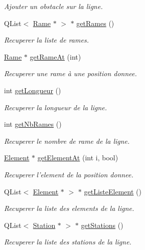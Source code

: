 \begin{DoxyCompactItemize}
\begin{DoxyCompactList}\small\item\em Ajouter un obstacle sur la ligne. \item\end{DoxyCompactList}\item 
QList$<$ \hyperlink{classRame}{Rame} $\ast$ $>$ $\ast$ \hyperlink{classLigne_aed26ffc704040dea3ba2b1a8b184a550}{getRames} ()
\begin{DoxyCompactList}\small\item\em Recuperer la liste de rames. \item\end{DoxyCompactList}\item 
\hyperlink{classRame}{Rame} $\ast$ \hyperlink{classLigne_a6c0c5346eff4bc5713241fd4f07fb9ef}{getRameAt} (int)
\begin{DoxyCompactList}\small\item\em Recuperer une rame à une position donnee. \item\end{DoxyCompactList}\item 
int \hyperlink{classLigne_a092ab7c50400c0580c23c9dcf3ba795b}{getLongueur} ()
\begin{DoxyCompactList}\small\item\em Recuperer la longueur de la ligne. \item\end{DoxyCompactList}\item 
int \hyperlink{classLigne_aa48c45c4ab09834ed3ce563985b4955a}{getNbRames} ()
\begin{DoxyCompactList}\small\item\em Recuperer le nombre de rame de la ligne. \item\end{DoxyCompactList}\item 
\hyperlink{classElement}{Element} $\ast$ \hyperlink{classLigne_ad1e50a586085b6d90142cebf0f6b445c}{getElementAt} (int i, bool)
\begin{DoxyCompactList}\small\item\em Recuperer l'element de la position donnee. \item\end{DoxyCompactList}\item 
QList$<$ \hyperlink{classElement}{Element} $\ast$ $>$ $\ast$ \hyperlink{classLigne_a23be9d51e86eac91160cec43bf2edbe0}{getListeElement} ()
\begin{DoxyCompactList}\small\item\em Recuperer la liste des elements de la ligne. \item\end{DoxyCompactList}\item 
QList$<$ \hyperlink{classStation}{Station} $\ast$ $>$ $\ast$ \hyperlink{classLigne_a8ced36e42672723b6e0037c389e59bb4}{getStations} ()
\begin{DoxyCompactList}\small\item\em Recuperer la liste des stations de la ligne. \item\end{DoxyCompactList}\end{DoxyCompactItemize}


